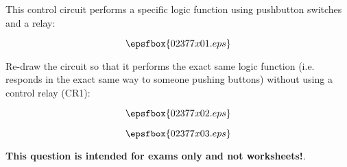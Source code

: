 

This control circuit performs a specific logic function using pushbutton switches and a relay:

$$\epsfbox{02377x01.eps}$$

Re-draw the circuit so that it performs the exact same logic function (i.e. responds in the exact same way to someone pushing buttons) without using a control relay (CR1):

$$\epsfbox{02377x02.eps}$$







$$\epsfbox{02377x03.eps}$$







{\bf This question is intended for exams only and not worksheets!}.



